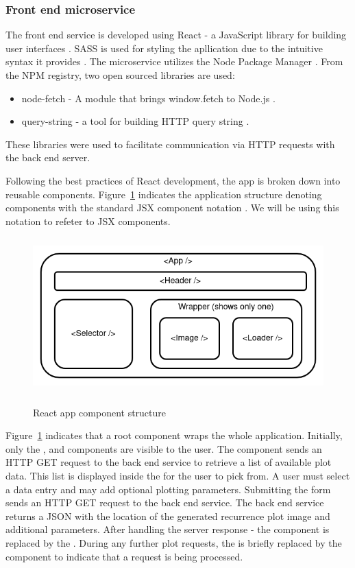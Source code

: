 \documentclass[a4paper,12pt,fleqn]{article}
\begin{document}
\subsubsection{Front end microservice}
The front end service is developed using React - a JavaScript library for building user interfaces \cite{react_home}.
SASS is used for styling the apllication due to the intuitive syntax it provides \cite{sass}.
The microservice utilizes the Node Package Manager \cite{npm}.
From the NPM registry, two open sourced libraries are used:
\begin{itemize}
  \item node-fetch - A module that brings window.fetch to Node.js \cite{node-fetch}.
  \item query-string - a tool for building HTTP query string \cite{query-string}.
\end{itemize}
These libraries were used to facilitate communication via HTTP requests with the back end server.

Following the best practices of React development, the app is broken down into reusable components.
Figure~\ref{fig:react_component_structure} indicates the application structure denoting components with the standard JSX component notation
. We will be using this notation to refeter to JSX components.
\begin{figure}[h]
  \centering
  {\includegraphics[height=6cm]{assets/react_component_structure.png}}
  \caption{React app component structure}
  \label{fig:react_component_structure}
\end{figure}

Figure~\ref{fig:react_component_structure} indicates that a root  component wraps the whole application.
Initially, only the ,  and  components are visible to the user.
The  component sends an HTTP GET request to the back end service to retrieve a list of available plot data.
This list is displayed inside the  for the user to pick from.
A user must select a data entry and may add optional plotting parameters.
Submitting the  form sends an HTTP GET request to the back end service.
The back end service returns a JSON with the location of the generated recurrence plot image and additional parameters.
After handling the server response - the  component is replaced by the .
During any further plot requests, the  is briefly replaced by the  component to indicate that a request is being processed.
\end{document}
